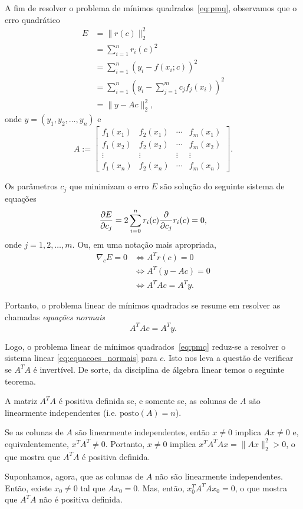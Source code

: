 A fim de resolver o problema de mínimos quadrados~\eqref{eq:pmq}, observamos que o erro quadrático
\begin{align}
  E &= \|r(c)\|_2^2 \\
    &= \sum_{i=1}^n r_i(c)^2 \\
    &= \sum_{i=1}^n \left(y_i - f(x_i;c)\right)^2 \\
    &= \sum_{i=1}^n \left(y_i - \sum_{j=1}^m c_jf_j(x_i)\right)^2 \\
    &= \|y - Ac\|_2^2,
\end{align}
onde $y = (y_1, y_2, \dotsc, y_n)$ e
\begin{equation}
  A :=
  \begin{bmatrix}
    f_1(x_1) & f_2(x_1) & \cdots & f_m(x_1) \\
    f_1(x_2) & f_2(x_2) & \cdots & f_m(x_2) \\
    \vdots & \vdots & \vdots & \vdots \\
    f_1(x_n) & f_2(x_n) & \cdots & f_m(x_n)
  \end{bmatrix}.
\end{equation}

Os parâmetros $c_j$ que minimizam o erro $E$ são solução do seguinte sistema de equações
\begin{equation}
  \frac{\partial E}{\partial c_j} = 2\sum_{i=0}^n r_i(c)\frac{\partial}{\partial c_j}r_i(c) = 0,
\end{equation}
onde $j=1, 2, \dotsc, m$. Ou, em uma notação mais apropriada,
\begin{align}
  \nabla_c E = 0 &\Leftrightarrow A^Tr(c) = 0\\
  &\Leftrightarrow A^T(y - Ac) = 0\\
  &\Leftrightarrow A^TAc = A^Ty.
\end{align}

Portanto, o problema linear de mínimos quadrados se resume em resolver as chamadas \emph{equações normais}
\begin{equation}\label{eq:equacoes_normais}
  A^TAc= A^Ty.
\end{equation}

Logo, o problema linear de mínimos quadrados~\eqref{eq:pmq} reduz-se a resolver o sistema linear \eqref{eq:equacoes_normais} para $c$. Isto nos leva a questão de verificar se $A^TA$ é invertível. De sorte, da disciplina de álgebra linear temos o seguinte teorema.

\begin{teo}
  A matriz $A^TA$ é positiva definida se, e somente se, as colunas de $A$ são linearmente independentes (i.e. $\text{posto}(A)=n$).
\end{teo}
\begin{dem}
  Se as colunas de $A$ são linearmente independentes, então $x\neq 0$ implica $Ax\neq 0$ e, equivalentemente, $x^TA^T\neq 0$. Portanto, $x\neq 0$ implica $x^TA^TAx = \|Ax\|_2^2 > 0$, o que mostra que $A^TA$ é positiva definida.

  Suponhamos, agora, que as colunas de $A$ não são linearmente independentes. Então, existe $x_0\neq 0$ tal que $Ax_0 = 0$. Mas, então, $x_0^TA^TAx_0=0$, o que mostra que $A^TA$ não é positiva definida. 
\end{dem}

